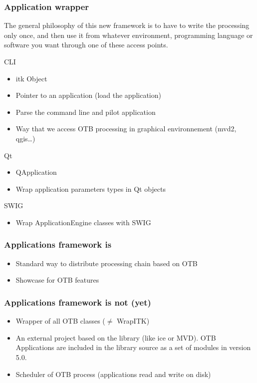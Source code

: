 \documentclass[8pt]{beamer}
\begin{document}
\begin{frame}
\frametitle{Application wrapper}
The general philosophy of this new framework is to have to write the processing
only once, and then use it from whatever environment, programming language or
software you want through one of these access points.

\begin{block}{CLI}
\begin{itemize}
\item itk Object
\item Pointer to an application (load the application)
\item Parse the command line and pilot application
\item Way that we access OTB processing in graphical environnement (mvd2, qgis\ldots)
\end{itemize}
\end{block}

\begin{block}{Qt}
\begin{itemize}
\item QApplication
\item Wrap application parameters types in Qt objects
\end{itemize}
\end{block}

\begin{block}{SWIG}
\begin{itemize}
\item Wrap ApplicationEngine classes with SWIG
\end{itemize}
\end{block}
\end{frame}

\begin{frame}
\frametitle{Applications framework is}
\begin{itemize}
\item Standard way to distribute processing chain based on OTB
\item Showcase for OTB features
\end{itemize}
\end{frame}

\begin{frame}
\frametitle{Applications framework is not (yet)}
\begin{itemize}
\item Wrapper of all OTB classes ($\neq$ WrapITK)
\item An external project based on the library (like ice or MVD). OTB
Applications are included in the library source as a set of modules in
version 5.0.
\item Scheduler of OTB process (applications read and write on disk)
\end{itemize}
\end{frame}
\end{document}
